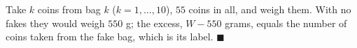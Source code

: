 Take $k$ coins from bag $k$ ($k=1,\dots,10$), $55$ coins in all, and weigh them. With no fakes they would weigh $550$ g; the excess, $W-550$ grams, equals the number of coins taken from the fake bag, which is its label. $\blacksquare$
